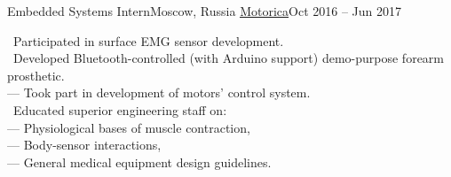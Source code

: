 \resumeSubheading
    {Embedded Systems Intern}{Moscow, Russia}
    {\href{https://global.motorica.org/}{\underline{Motorica}}}{Oct 2016 -- Jun 2017}
    \begin{itemize}[leftmargin=0in, label={}]
        \small{\item{
            {\textbullet \ Participated in surface EMG sensor development.}\\
            {\textbullet \ Developed Bluetooth-controlled (with Arduino support) demo-purpose forearm prosthetic.}\\
            {— Took part in development of motors' control system.}\\
            {\textbullet \ Educated superior engineering staff on:}\\
            {— Physiological bases of muscle contraction,}\\
            {— Body-sensor interactions,}\\
            {— General medical equipment design guidelines.}\\
        }}
    \end{itemize}
